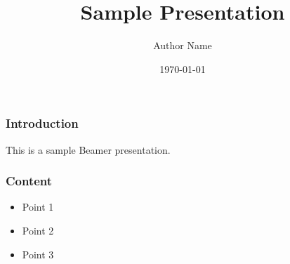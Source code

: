 \documentclass{beamer}
\title{Sample Presentation}
\author{Author Name}
\date{\today}
\begin{document}
\frame{\titlepage}

\begin{frame}
    \frametitle{Introduction}
    This is a sample Beamer presentation.
\end{frame}

\begin{frame}
    \frametitle{Content}
    \begin{itemize}
        \item Point 1
        \item Point 2
        \item Point 3
    \end{itemize}
\end{frame}
\end{document}
